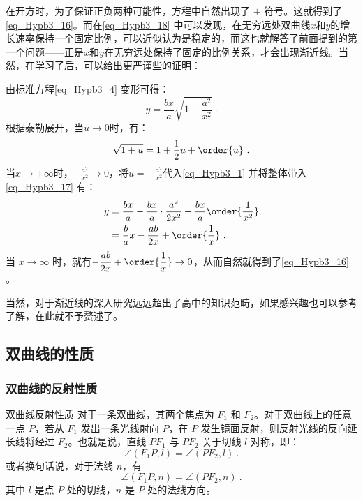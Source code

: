 在开方时，为了保证正负两种可能性，方程中自然出现了 $\pm$ 符号。这就得到了\autoref{eq_Hypb3_16}。而在\autoref{eq_Hypb3_18} 中可以发现，在无穷远处双曲线$x$和$y$的增长速率保持一个固定比例，可以近似认为是稳定的，而这也就解答了前面提到的第一个问题——正是$x$和$y$在无穷远处保持了固定的比例关系，才会出现渐近线。当然，在学习了后，可以给出更严谨些的证明：

由标准方程\autoref{eq_Hypb3_4} 变形可得：
\begin{equation}\label{eq_Hypb3_17}
y = \frac{bx}{a} \sqrt{1-\frac{a^2}{x^2}}~.
\end{equation}
根据泰勒展开，当$u\to 0$时，有：
\begin{equation}\label{eq_Hypb3_1}
\sqrt{1+u} = 1+\frac{1}{2}u+\order{u}~.
\end{equation}
当$x\to+\infty$时，$-\displaystyle\frac{a^2}{x^2}\to0$，将$\displaystyle u=-\frac{a^2}{x^2}$代入\autoref{eq_Hypb3_1} 并将整体带入\autoref{eq_Hypb3_17} 有：
\begin{equation}\label{eq_Hypb3_13}
\begin{split}
y &= \frac{bx}{a} -\frac{bx}{a} \cdot\frac{a^2}{2x^2}+\frac{bx}{a}\order{\frac{1}{x^2}}\\
& = \frac ba x - \frac{ab}{2x} + \order{\frac{1}{x}}~.
\end{split}
\end{equation}
当 $x\to\infty$ 时，就有$\displaystyle- \frac{ab}{2x} + \order{\frac{1}{x}}\to0$，从而自然就得到了\autoref{eq_Hypb3_16} 。

当然，对于渐近线的深入研究远远超出了高中的知识范畴，如果感兴趣也可以参考了解，在此就不予赘述了。

\subsection{双曲线的性质}

\subsubsection{双曲线的反射性质}

\begin{theorem}{双曲线反射性质}
对于一条双曲线，其两个焦点为 $F_1$ 和 $F_2$。对于双曲线上的任意一点 $P$，若从 $F_1$ 发出一条光线射向 $P$，在 $P$ 发生镜面反射，则反射光线的反向延长线将经过 $F_2$。也就是说，直线 $PF_1$ 与 $PF_2$ 关于切线 $l$ 对称，即：
\begin{equation}
\angle(F_1P, l) = \angle(PF_2, l)~.
\end{equation}
或者换句话说，对于法线 $n$，有
\begin{equation}
\angle(F_1P, n) = \angle(PF_2, n)~.
\end{equation}
其中 $l$ 是点 $P$ 处的切线，$n$ 是 $P$ 处的法线方向。
\end{theorem}

